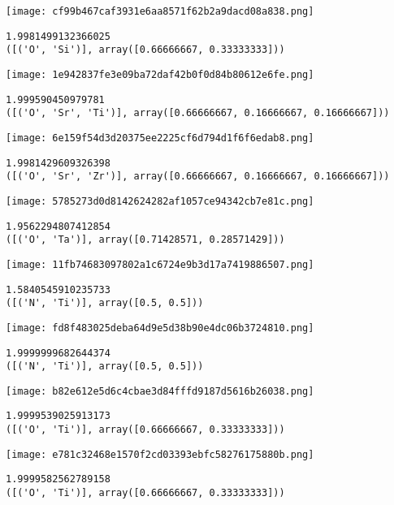 \texttt{[image: cf99b467caf3931e6aa8571f62b2a9dacd08a838.png]}

\begin{lstlisting}
1.9981499132366025
([('O', 'Si')], array([0.66666667, 0.33333333]))
\end{lstlisting}

\texttt{[image: 1e942837fe3e09ba72daf42b0f0d84b80612e6fe.png]}

\begin{lstlisting}
1.999590450979781
([('O', 'Sr', 'Ti')], array([0.66666667, 0.16666667, 0.16666667]))
\end{lstlisting}

\texttt{[image: 6e159f54d3d20375ee2225cf6d794d1f6f6edab8.png]}

\begin{lstlisting}
1.9981429609326398
([('O', 'Sr', 'Zr')], array([0.66666667, 0.16666667, 0.16666667]))
\end{lstlisting}

\texttt{[image: 5785273d0d8142624282af1057ce94342cb7e81c.png]}

\begin{lstlisting}
1.9562294807412854
([('O', 'Ta')], array([0.71428571, 0.28571429]))
\end{lstlisting}

\texttt{[image: 11fb74683097802a1c6724e9b3d17a7419886507.png]}

\begin{lstlisting}
1.5840545910235733
([('N', 'Ti')], array([0.5, 0.5]))
\end{lstlisting}

\texttt{[image: fd8f483025deba64d9e5d38b90e4dc06b3724810.png]}

\begin{lstlisting}
1.9999999682644374
([('N', 'Ti')], array([0.5, 0.5]))
\end{lstlisting}

\texttt{[image: b82e612e5d6c4cbae3d84fffd9187d5616b26038.png]}

\begin{lstlisting}
1.9999539025913173
([('O', 'Ti')], array([0.66666667, 0.33333333]))
\end{lstlisting}

\texttt{[image: e781c32468e1570f2cd03393ebfc58276175880b.png]}

\begin{lstlisting}
1.9999582562789158
([('O', 'Ti')], array([0.66666667, 0.33333333]))
\end{lstlisting}

